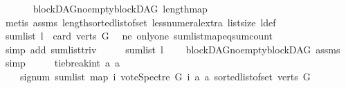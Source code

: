 \begin{isabellebody}
\ \ \ \ \isamarkupfalse%
\ \ blockDAG{\isachardot}{\kern0pt}no{\isacharunderscore}{\kern0pt}empty{\isacharunderscore}{\kern0pt}blockDAG\ length{\isacharunderscore}{\kern0pt}map\isanewline
\ \ \ \ \isamarkupfalse%
\ {\isacharparenleft}{\kern0pt}metis\ assms{\isacharparenleft}{\kern0pt}{}{\isacharparenright}{\kern0pt}\ length{\isacharunderscore}{\kern0pt}sorted{\isacharunderscore}{\kern0pt}list{\isacharunderscore}{\kern0pt}of{\isacharunderscore}{\kern0pt}set\ less{\isacharunderscore}{\kern0pt}numeral{\isacharunderscore}{\kern0pt}extra{\isacharparenleft}{\kern0pt}{}{\isacharparenright}{\kern0pt}\ list{\isachardot}{\kern0pt}size{\isacharparenleft}{\kern0pt}{}{\isacharparenright}{\kern0pt}\ l{\isacharunderscore}{\kern0pt}def{\isacharparenright}{\kern0pt}\isanewline
\ \ \isamarkupfalse%
\ {\isachardoublequoteopen}sum{\isacharunderscore}{\kern0pt}list\ l\ {\isacharequal}{\kern0pt}\ card\ {\isacharparenleft}{\kern0pt}verts\ G{\isacharparenright}{\kern0pt}{\isachardoublequoteclose}\ \isamarkupfalse%
\ ne\ only{\isacharunderscore}{\kern0pt}one\ sum{\isacharunderscore}{\kern0pt}list{\isacharunderscore}{\kern0pt}map{\isacharunderscore}{\kern0pt}eq{\isacharunderscore}{\kern0pt}sum{\isacharunderscore}{\kern0pt}count\isanewline
\ \ \ \ \isamarkupfalse%
\ {\isacharparenleft}{\kern0pt}simp\ add{\isacharcolon}{\kern0pt}\ sum{\isacharunderscore}{\kern0pt}list{\isacharunderscore}{\kern0pt}triv{\isacharparenright}{\kern0pt}\isanewline
\ \ \isamarkupfalse%
\ \isamarkupfalse%
\ {\isachardoublequoteopen}sum{\isacharunderscore}{\kern0pt}list\ l\ {\isachargreater}{\kern0pt}\ {}{\isachardoublequoteclose}\ \isamarkupfalse%
\ blockDAG{\isachardot}{\kern0pt}no{\isacharunderscore}{\kern0pt}empty{\isacharunderscore}{\kern0pt}blockDAG\ assms{\isacharparenleft}{\kern0pt}{}{\isacharparenright}{\kern0pt}\ \isamarkupfalse%
\ simp\isanewline
\ \ \isamarkupfalse%
\ \isamarkupfalse%
\ {\isachardoublequoteopen}tie{\isacharunderscore}{\kern0pt}break{\isacharunderscore}{\kern0pt}int\ a\ a\isanewline
\ \ \ \ {\isacharparenleft}{\kern0pt}signum\ {\isacharparenleft}{\kern0pt}sum{\isacharunderscore}{\kern0pt}list\ {\isacharparenleft}{\kern0pt}map\ {\isacharparenleft}{\kern0pt}{\isasymlambda}i{\isachardot}{\kern0pt}\ vote{\isacharunderscore}{\kern0pt}Spectre\ G\ i\ a\ a{\isacharparenright}{\kern0pt}\ {\isacharparenleft}{\kern0pt}sorted{\isacharunderscore}{\kern0pt}list{\isacharunderscore}{\kern0pt}of{\isacharunderscore}{\kern0pt}set\ {\isacharparenleft}{\kern0pt}verts\ G{\isacharparenright}{\kern0pt}{\isacharparenright}{\kern0pt}{\isacharparenright}{\kern0pt}{\isacharparenright}{\kern0pt}{\isacharparenright}{\kern0pt}\ {\isacharequal}{\kern0pt}\ {}{\isachardoublequoteclose}\isanewline

\end{isabellebody}
